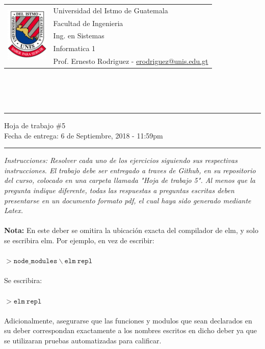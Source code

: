 \documentclass{article}
\newcommand{\horrule}[1]{\rule{\linewidth}{#1}}
\begin{document}
\begin{tabular}{l l}
\multirow{5}{*}{\includegraphics[width=2cm]{../../recursos/logo.png}}
 & Universidad del Istmo de Guatemala \\
 & Facultad de Ingenieria \\
 & Ing. en Sistemas \\
 & Informatica 1 \\
 & Prof. Ernesto Rodriguez - \href{mailto:erodriguez@unis.edu.gt}{erodriguez@unis.edu.gt} \\
\end{tabular}
\\\\\\

\begin{center}
        \horrule{0.5pt}
        \huge{Hoja de trabajo \#5} \\
        \large{Fecha de entrega: 6 de Septiembre, 2018 - 11:59pm} \\
        \horrule{1pt}
\end{center}

\emph{Instrucciones: Resolver cada uno de los ejercicios siguiendo sus respectivas
instrucciones. El trabajo debe ser entregado a traves de Github, en su repositorio del curso, colocado en una
carpeta llamada "Hoja de trabajo 5". Al menos que la pregunta indique diferente, todas las
respuestas a preguntas escritas deben presentarse en un documento formato pdf, el cual
haya sido generado mediante Latex. }\\\\

{\bf Nota: }En este deber se omitira la ubicaci\'on exacta del compilador
de elm, y solo se escribira elm. Por ejemplo, en vez de escribir:\\\\
$>\mathtt{node\_modules}\backslash\mathtt{elm\ repl}$\\\\
Se escribira:\\\\
$>\mathtt{elm\ repl}$\\\\
Adicionalmente, asegurarse que las funciones y modulos que sean declarados
en su deber correspondan exactamente a los nombres escritos en dicho deber
ya que se utilizaran pruebas automatizadas para calificar.
\end{document}

